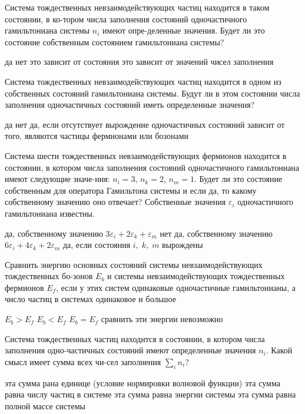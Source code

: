 \documentclass[11pt,a4paper]{exam}
\begin{document}
\begin{questions}
\question Система тождественных невзаимодействующих частиц находится в таком состоянии, в ко-тором числа заполнения состояний одночастичного гамильтониана системы ${n_i}$ имеют опре-деленные значения. Будет ли это состояние собственным состоянием гамильтониана системы?
\begin{choices}
\choice да
\choice нет
\choice это зависит от состояния
\choice это зависит от значений чисел заполнения
\end{choices}

\question Система тождественных невзаимодействующих частиц находится в одном из собственных состояний гамильтониана системы. Будут ли в этом состоянии числа заполнения одночастичных состояний иметь определенные значения?
\begin{choices}
\choice да
\choice нет
\choice да, если отсутствует вырождение одночастичных состояний
\choice зависит от того, являются частицы фермионами или бозонами
\end{choices}

\question Система шести тождественных невзаимодействующих фермионов находится в состоянии, в котором числа заполнения состояний одночастичного гамильтониана имеют следующие значе-ния: ${n_i} = 3$, ${n_k} = 2$, ${n_m} = 1$. Будет ли это состояние собственным для оператора Гамильтона системы и если да, то какому собственному значению оно отвечает? Собственные значения ${\varepsilon _i}$ одночастичного гамильтониана известны.
\begin{choices}
\choice да, собственному значению $3{\varepsilon _i} + 2{\varepsilon _k} + {\varepsilon _m}$
\choice нет
\choice да, собственному значению $6{\varepsilon _i} + 4{\varepsilon _k} + 2{\varepsilon _m}$
\choice да, если состояния $i,\;k,\;m$ вырождены 
\end{choices}

\question Сравнить энергию основных состояний системы невзаимодействующих тождественных бо-зонов ${E_b}$ и системы невзаимодействующих тождественных фермионов ${E_f}$, если у этих систем одинаковые одночастичные гамильтонианы, а число частиц в системах одинаковое и большое
\begin{choices}
\choice ${E_b} > {E_f}$         
\choice ${E_b} < {E_f}$
\choice ${E_b} = {E_f}$         
\choice сравнить эти энергии невозможно
\end{choices}

\question Система тождественных частиц находится в состоянии, в котором числа заполнения одно-частичных состояний имеют определенные значения ${n_i}$. Какой смысл имеет сумма всех чи-сел заполнения $\sum\limits_i {{n_i}} $?
\begin{choices}
\choice эта сумма рана единице (условие нормировки волновой функции)   
\choice эта сумма равна числу частиц в системе
\choice эта сумма равна энергии системы
\choice эта сумма равна полной массе системы
\end{choices}


\end{questions}
\end{document}

